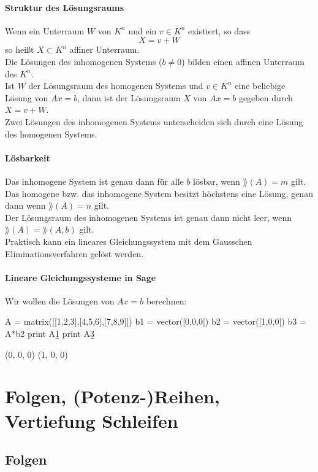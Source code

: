 \documentclass[fontsize=12pt,paper=a4,twoside,bibtotoc,idxtotoc,
liststotoc,pagesize,BCOR1.2cm,DIV15,chapterprefix,pagesize=pdftex]{scrbook}
\theoremstyle{plain}
\theoremstyle{definition}
\theoremstyle{remark}
\begin{document}
\subsubsection{Struktur des Lösungsraums}
Wenn ein Unterraum $W$ von $K^n$ und ein $v \in K^n$ existiert, so dass 
\[X=v+W\]
so heißt $X \subset K^n$ affiner Unterraum.\\
Die Lösungen des inhomogenen Systems ($b \neq 0$) bilden einen affinen
Unterraum des $K^n$.\\
Ist $W$ der Lösungsraum des homogenen Systems und $v \in K^n$
eine beliebige Lösung von $Ax=b$, dann ist der Lösungsraum $X$ von $Ax=b$
gegeben durch  $X=v+W$.\\
Zwei Lösungen des inhomogenen Systems unterscheiden sich durch
eine Lösung des homogenen Systems.
\subsubsection{Lösbarkeit}
Das inhomogene System ist genau dann für alle $b$
lösbar, wenn $\rang(A)=m$ gilt.\\
Das homogene bzw. das inhomogene System besitzt höchstens eine
Lösung, genau dann wenn $\rang(A)=n$ gilt.\\
Der Lösungsraum des inhomogenen Systems ist genau dann nicht
leer, wenn $\rang(A)=\rang(A, b)$ gilt.\\ %
Praktisch kann ein lineares Gleichungssystem mit dem Gausschen
Eliminationsverfahren gelöst werden.
\subsubsection{Lineare Gleichungssysteme in Sage}
Wir wollen die Lösungen von $Ax=b$ berechnen: 
\begin{sagein}
A = matrix([[1,2,3],[4,5,6],[7,8,9]])
b1 = vector([0,0,0])
b2 = vector([1,0,0])
b3 = A*b2
print A\b1
print A\b3
\end{sagein}
\begin{sage}
(0, 0, 0)
(1, 0, 0) 
\end{sage}


\chapter{Folgen, (Potenz-)Reihen, Vertiefung Schleifen}
\section{Folgen}
\end{document}
